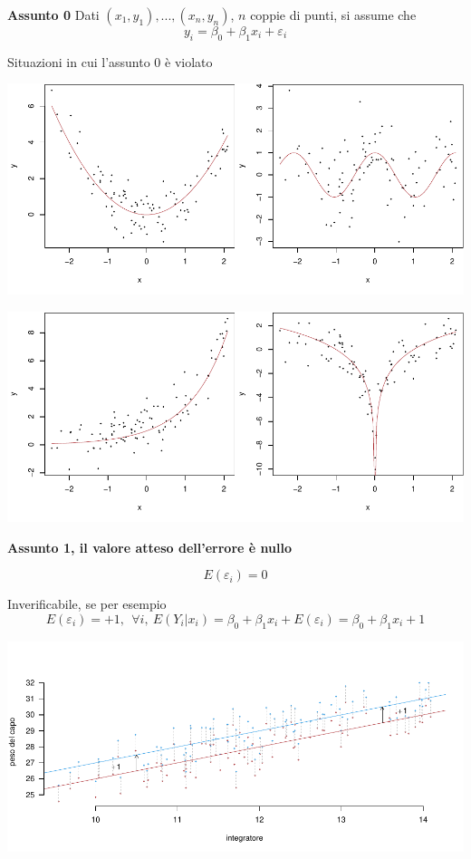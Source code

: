 \documentclass[
  11pt,
]{book}
\theoremstyle{mytheoremstyle}
\theoremstyle{mydefstyle}
\begin{document}
\textbf{Assunto 0}
Dati \((x_1,y_1),...,(x_n,y_n)\), \(n\) coppie di punti, si assume che
\[y_i=\beta_0+\beta_1x_i+\varepsilon_i\]

Situazioni in cui l'assunto 0 è violato

\begin{center}\includegraphics{Appunti_di_Statistica_2025_files/figure-latex/17-regressione-I-20-1} \end{center}

\begin{center}\includegraphics{Appunti_di_Statistica_2025_files/figure-latex/17-regressione-I-20-2} \end{center}

\textbf{Assunto 1, il valore atteso dell'errore è nullo}

\[E(\varepsilon_i)=0\]

Inverificabile, se per esempio
\[E(\varepsilon_i)=+1,~~\forall i,~ E(Y_i|x_i)=\beta_0+\beta_1x_i+E(\varepsilon_i)=\beta_0+\beta_1x_i+1\]

\begin{center}\includegraphics{Appunti_di_Statistica_2025_files/figure-latex/17-regressione-I-21-1} \end{center}
\end{document}
